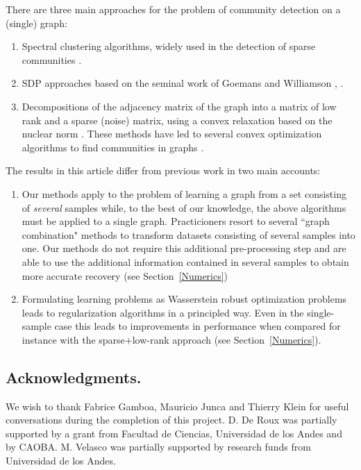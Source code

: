 \documentclass[12pt]{amsart}
\theoremstyle{remark}
\begin{document}
There are three main approaches for the problem of community detection on a (single) graph: 

\begin{enumerate}
\item Spectral clustering algorithms, widely used in the detection of sparse communities \cite{bordenave2015non, chin2015stochastic,krzakala2013spectral, massoulie2014community}. 

\item SDP approaches based on the seminal work of Goemans and Williamson \cite{goemans1995improved}, \cite{abbe2016exact,guedon2016community, montanari2016semidefinite}.

\item Decompositions of the adjacency matrix of the graph into a matrix of low rank and a sparse (noise) matrix, using a convex relaxation based on the nuclear norm \cite{candes2011robust,chandrasekaran2011rank,candes2009exact}. These methods have led to several convex optimization algorithms to find communities in graphs \cite{ames2011nuclear,vinayak2014sharp,chen2012clustering,chen2014clustering,oymak2011finding,ailon2013breaking}.

\end{enumerate}

The results in this article differ from previous work in two main accounts:

\begin{enumerate}
\item Our methods apply to the problem of learning a graph from a set consisting of {\it several} samples while, to the best of our knowledge, the above algorithms must be applied to a single graph. Practicioners resort to several ``graph combination" methods to transform datasets consisting of several samples into one. Our methods do not require this additional pre-processing step and are able to use the additional information contained in several samples to obtain more accurate recovery (see Section~\ref{Numerics})

\item Formulating learning problems as Wasserstein robust optimization problems leads to regularization algorithms in a principled way. Even in the single-sample case this leads to improvements in performance when compared for instance with the sparse+low-rank approach (see Section~\ref{Numerics}).
\end{enumerate}


\subsection{Acknowledgments.}
We wish to thank Fabrice Gamboa, Mauricio Junca and Thierry Klein for useful conversations during the completion of this project. D. De Roux was partially supported by a grant from Facultad de Ciencias, Universidad de los Andes and by CAOBA. M. Velasco was partially supported by research funds from Universidad de los Andes. 
\end{document}
